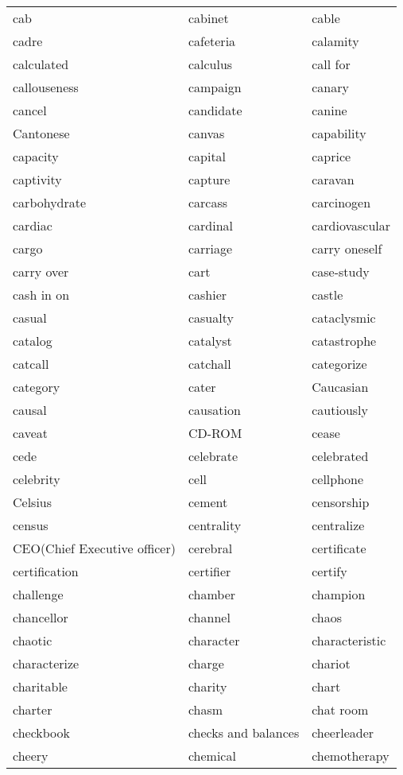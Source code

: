 \documentclass{minimal}
\begin{document}
\begin{longtable}{p{2.7cm}@{\hskip 0.2cm}p{2.7cm}@{\hskip 0.2cm}p{2.7cm}}
cab & cabinet & cable \\
cadre & cafeteria & calamity \\
calculated & calculus & call for \\
callouseness & campaign & canary \\
cancel & candidate & canine \\
Cantonese & canvas & capability \\
capacity & capital & caprice \\
captivity & capture & caravan \\
carbohydrate & carcass & carcinogen \\
cardiac & cardinal & cardiovascular \\
cargo & carriage & carry oneself \\
carry over & cart & case-study \\
cash in on & cashier & castle \\
casual & casualty & cataclysmic \\
catalog & catalyst & catastrophe \\
catcall & catchall & categorize \\
category & cater & Caucasian \\
causal & causation & cautiously \\
caveat & CD-ROM & cease \\
cede & celebrate & celebrated \\
celebrity & cell & cellphone \\
Celsius & cement & censorship \\
census & centrality & centralize \\
CEO(Chief Executive officer) & cerebral & certificate \\
certification & certifier & certify \\
challenge & chamber & champion \\
chancellor & channel & chaos \\
chaotic & character & characteristic \\
characterize & charge & chariot \\
charitable & charity & chart \\
charter & chasm & chat room \\
checkbook & checks and balances & cheerleader \\
cheery & chemical & chemotherapy \\

\end{longtable}
\end{document}
